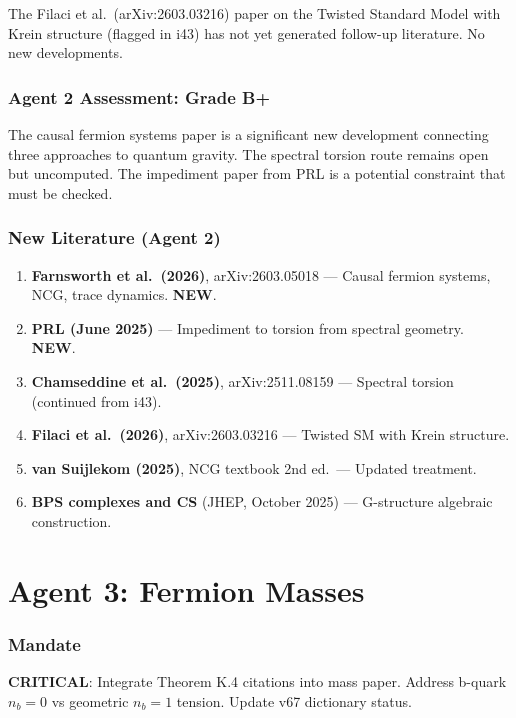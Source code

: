 \documentclass[11pt,a4paper]{article}
\newcommand{\NEW}{\textcolor{dfdblue}{\textbf{NEW}}}
\begin{document}
The Filaci et al.\ (arXiv:2603.03216) paper on the Twisted Standard Model with Krein structure (flagged in i43) has not yet generated follow-up literature. No new developments.

\section{Agent 2 Assessment: Grade B+}

The causal fermion systems paper is a significant new development connecting three approaches to quantum gravity. The spectral torsion route remains open but uncomputed. The impediment paper from PRL is a potential constraint that must be checked.

\section{New Literature (Agent 2)}

\begin{enumerate}
\item \textbf{Farnsworth et al.\ (2026)}, arXiv:2603.05018 --- Causal fermion systems, NCG, trace dynamics. \NEW.
\item \textbf{PRL (June 2025)} --- Impediment to torsion from spectral geometry. \NEW.
\item \textbf{Chamseddine et al.\ (2025)}, arXiv:2511.08159 --- Spectral torsion (continued from i43).
\item \textbf{Filaci et al.\ (2026)}, arXiv:2603.03216 --- Twisted SM with Krein structure.
\item \textbf{van Suijlekom (2025)}, NCG textbook 2nd ed.\ --- Updated treatment.
\item \textbf{BPS complexes and CS} (JHEP, October 2025) --- G-structure algebraic construction.
\end{enumerate}


\part{Agent 3: Fermion Masses}
\label{part:agent3}

\section{Mandate}

\textbf{CRITICAL}: Integrate Theorem K.4 citations into mass paper. Address b-quark $n_b = 0$ vs geometric $n_b = 1$ tension. Update v67 dictionary status.
\end{document}
